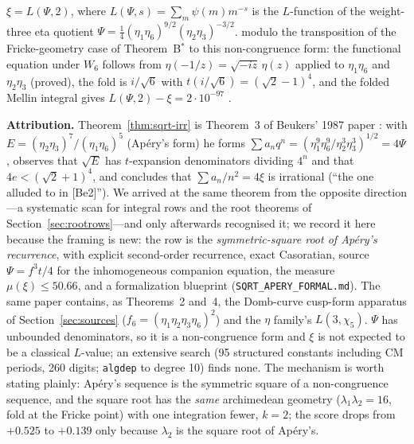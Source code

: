 \begin{theorem}\label{thm:sqrt-period}
$\xi=L(\Psi,2)$, where $L(\Psi,s)=\sum_m\psi(m)m^{-s}$ is the $L$-function of the weight-three eta quotient $\Psi=\tfrac14(\eta_1\eta_6)^{9/2}(\eta_2\eta_3)^{-3/2}$. \Proved{} modulo the transposition of the Fricke-geometry case of Theorem~B$^*$ to this non-congruence form: the functional equation under $W_6$ follows from $\eta(-1/z)=\sqrt{-iz}\,\eta(z)$ applied to $\eta_1\eta_6$ and $\eta_2\eta_3$ \textup{(}proved\textup{)}, the fold is $i/\sqrt6$ with $t(i/\sqrt6)=(\sqrt2-1)^4$, and the folded Mellin integral gives $L(\Psi,2)-\xi=2\cdot10^{-97}$ .
\end{theorem}

\textbf{Attribution.} Theorem~\ref{thm:sqrt-irr} is Theorem~3 of Beukers' 1987 paper \cite{Beukers1987}: with $E=(\eta_2\eta_3)^7/(\eta_1\eta_6)^5$ (Ap\'ery's form) he forms $\sum a_nq^n=(\eta_1^9\eta_6^9/\eta_2^3\eta_3^3)^{1/2}=4\Psi$, observes that $\sqrt{E}$ has $t$-expansion denominators dividing $4^n$ and that $4e<(\sqrt2+1)^4$, and concludes that $\sum a_n/n^2=4\xi$ is irrational (``the one alluded to in [Be2]''). We arrived at the same theorem from the opposite direction---a systematic scan for integral rows and the root theorems of Section~\ref{sec:rootrows}---and only afterwards recognised it; we record it here because the framing is new: the row is the \emph{symmetric-square root of Ap\'ery's recurrence}, with explicit second-order recurrence, exact Casoratian, source $\Psi=f^3t/4$ for the inhomogeneous companion equation, the measure $\mu(\xi)\le50.66$, and a formalization blueprint (\texttt{SQRT\_APERY\_FORMAL.md}). The same paper contains, as Theorems~2 and~4, the Domb-curve cusp-form apparatus of Section~\ref{sec:sources} ($f_6=(\eta_1\eta_2\eta_3\eta_6)^2$) and the $\eta$ family's $L(3,\chi_5)$. $\Psi$ has unbounded denominators, so it is a non-congruence form \cite{CDT2024} and $\xi$ is not expected to be a classical $L$-value; an extensive search (95 structured constants including CM periods, 260 digits; \texttt{algdep} to degree 10) finds none. The mechanism is worth stating plainly: Ap\'ery's sequence is the symmetric square of a non-congruence sequence, and the square root has the \emph{same} archimedean geometry ($\lambda_1\lambda_2=16$, fold at the Fricke point) with one integration fewer, $k=2$; the score drops from $+0.525$ to $+0.139$ only because $\lambda_2$ is the square root of Ap\'ery's.
